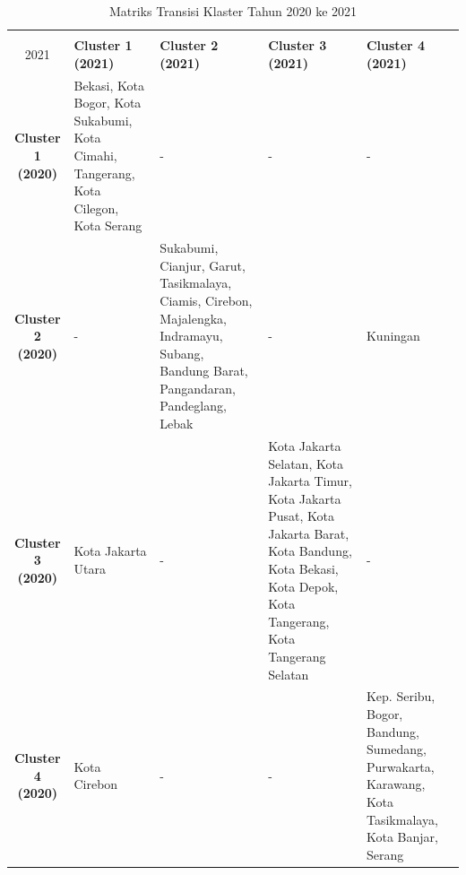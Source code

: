 \begin{table}[H]
\centering
\caption{Matriks Transisi Klaster Tahun 2020 ke 2021} \label{tab:transisi_2020_2021}
\begin{tabular}{|c|p{2cm}|p{2cm}|p{2cm}|p{2cm}|}
\hline
\textbf{Tahun 2020 \\ 2021} & \textbf{Cluster 1 (2021)} & \textbf{Cluster 2 (2021)} & \textbf{Cluster 3 (2021)} & \textbf{Cluster 4 (2021)} \\ \hline
\textbf{Cluster 1 (2020)} & Bekasi, Kota Bogor, Kota Sukabumi, Kota Cimahi, Tangerang, Kota Cilegon, Kota Serang & - & - & - \\ \hline
\textbf{Cluster 2 (2020)} & - & Sukabumi, Cianjur, Garut, Tasikmalaya, Ciamis, Cirebon, Majalengka, Indramayu, Subang, Bandung Barat, Pangandaran, Pandeglang, Lebak & - & Kuningan \\ \hline
\textbf{Cluster 3 (2020)} & Kota Jakarta Utara & - & Kota Jakarta Selatan, Kota Jakarta Timur, Kota Jakarta Pusat, Kota Jakarta Barat, Kota Bandung, Kota Bekasi, Kota Depok, Kota Tangerang, Kota Tangerang Selatan & - \\ \hline
\textbf{Cluster 4 (2020)} & Kota Cirebon & - & - & Kep. Seribu, Bogor, Bandung, Sumedang, Purwakarta, Karawang, Kota Tasikmalaya, Kota Banjar, Serang \\ \hline
\end{tabular}
\end{table}